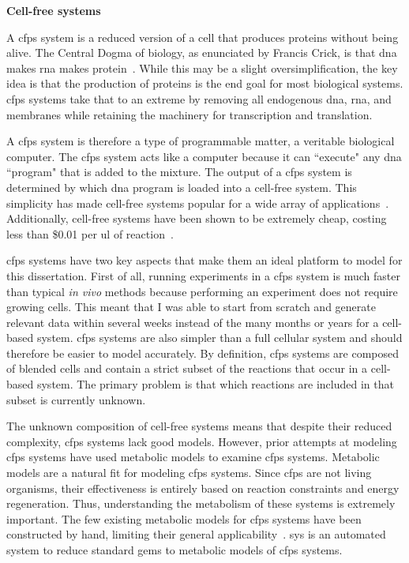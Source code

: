 \textbf{Cell-free systems}

A \gls{cfps} system is a reduced version of a cell that produces proteins without being alive.
The Central Dogma of biology, as enunciated by Francis Crick, is that \gls{dna} makes \gls{rna} makes protein~\cite{crick1970central}.
While this may be a slight oversimplification, the key idea is that the production of proteins is the end goal for most biological systems.
\gls{cfps} systems take that to an extreme by removing all endogenous \gls{dna}, \gls{rna}, and membranes while retaining the machinery for transcription and translation.

A \gls{cfps} system is therefore a type of programmable matter, a veritable biological computer.
The \gls{cfps} system acts like a computer because it can ``execute" any \gls{dna} ``program" that is added to the mixture.
The output of a \gls{cfps} system is determined by which \gls{dna} program is loaded into a cell-free system.
This simplicity has made cell-free systems popular for a wide array of applications~\cite{hodgman2012cell, rollin2013new, carlson2012cell}.
Additionally, cell-free systems have been shown to be extremely cheap, costing less than \$0.01 per \gls{ul} of reaction~\cite{sun2013protocols, murray2013cost}.

\gls{cfps} systems have two key aspects that make them an ideal platform to model for this dissertation.
First of all, running experiments in a \gls{cfps} system is much faster than typical \textit{in vivo} methods because performing an experiment does not require growing cells.
This meant that I was able to start from scratch and generate relevant data within several weeks instead of the many months or years for a cell-based system.
\gls{cfps} systems are also simpler than a full cellular system and should therefore be easier to model accurately.
By definition, \gls{cfps} systems are composed of blended cells and contain a strict subset of the reactions that occur in a cell-based system.
The primary problem is that which reactions are included in that subset is currently unknown.

The unknown composition of cell-free systems means that despite their reduced complexity, \gls{cfps} systems lack good models.
However, prior attempts at modeling \gls{cfps} systems have used metabolic models to examine \gls{cfps} systems.
Metabolic models are a natural fit for modeling \gls{cfps} systems.
Since \gls{cfps} are not living organisms, their effectiveness is entirely based on reaction constraints and energy regeneration.
Thus, understanding the metabolism of these systems is extremely important.
The few existing metabolic models for \gls{cfps} systems have been constructed by hand, limiting their general applicability~\cite{bujara2012silico, vilkhovoy2017sequence}.
\gls{sys} is an automated system to reduce standard \glspl{gem} to metabolic models of \gls{cfps} systems.

